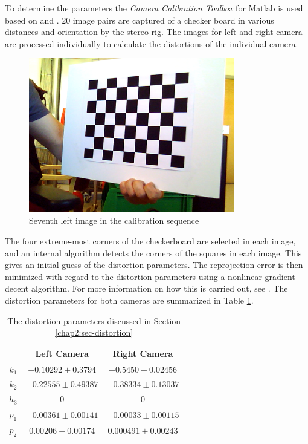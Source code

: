 To determine the parameters the \emph{Camera Calibration Toolbox} for Matlab is used
\cite{camera-calib-toolbox} based on \cite{heikila} and \cite{mat-toolbox}.
20 image pairs are captured of a checker board in various
distances and orientation by the stereo rig. The images for left and right camera are
processed individually to calculate the distortions of the individual camera. 
\begin{figure}[htbp]
    \centering
    \includegraphics[width=0.8\textwidth]{pics/left7}
    \caption{Seventh left image in the calibration sequence}
    \label{chap2:fig-checkerboard}
\end{figure}
The four extreme-most corners of the checkerboard are selected in each image, and an
internal algorithm detects the corners of the squares in each image. This gives an initial
guess of the distortion parameters. The reprojection error is then minimized with
regard to the distortion parameters using a nonlinear gradient decent algorithm. For more
information on how this is carried out, see \cite{heikkila}.
The distortion parameters for both cameras are summarized in Table
\ref{chap3:tab-distortion-coeffs}.
\begin{table}[htbp]
  \centering
    \begin{tabular}{|c|c|c|} 
        \hline
                & Left Camera       & Right Camera \\
        \hline
        $k_1$   & $-0.10292 \pm 0.3794$            & $-0.5450 \pm 0.02456$  \\
        $k_2$   & $-0.22555 \pm 0.49387$            & $-0.38334 \pm 0.13037$  \\
        $h_3$   & $ 0$                          & $0$                  \\
        \hline
        $p_1$   & $-0.00361 \pm 0.00141$    & $-0.00033 \pm 0.00115$ \\
        $p_2$   & $0.00206 \pm 0.00174$     & $ 0.000491 \pm 0.00243$  \\
        \hline
    \end{tabular}
    \caption{The distortion parameters discussed in Section \ref{chap2:sec-distortion}}
    \label{chap3:tab-distortion-coeffs}
\end{table}

